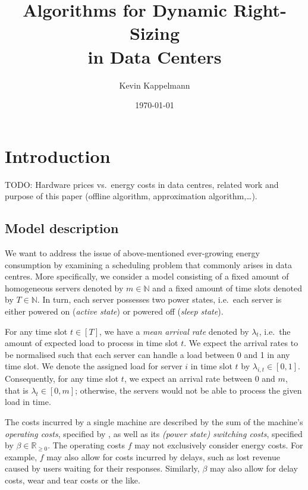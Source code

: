 \documentclass[hidelinks]{article}
\title{\textbf{Algorithms for Dynamic Right-Sizing\\in Data Centers}}
\author{Kevin Kappelmann}
\affil{Chair for Theoretical Computer Science,\\ Technical University of Munich}
\date{\today}
\theoremstyle{plain}
\theoremstyle{definition}
\theoremstyle{rem}
\begin{document}
\maketitle
\newpage
\begingroup\hypersetup{linkcolor=black}
\tableofcontents
\endgroup 
\newpage


\section{Introduction}
TODO: Hardware prices vs.\ energy costs in data centres, related work and purpose of this paper (offline algorithm, approximation algorithm,\ldots).

\subsection{Model description}\label{sec_model_descr}
We want to address the issue of above-mentioned ever-growing energy consumption by examining a scheduling problem that commonly arises in data centres. More specifically, we consider a model consisting of a fixed amount of homogeneous servers denoted by $m\in\mathbb{N}$ and a fixed amount of time slots denoted by $T\in\mathbb{N}$. In turn, each server possesses two power states, i.e.\ each server is either powered on (\textit{active state}) or powered off (\textit{sleep state}).
	
For any time slot $t\in[T]$, we have a \textit{mean arrival rate} denoted by $\lambda_t$, i.e.\ the amount of expected load to process in time slot $t$. We expect the arrival rates to be normalised such that each server can handle a load between 0 and 1 in any time slot. We denote the assigned load for server $i$ in time slot $t$ by $\lambda_{i,t}\in[0,1]$. Consequently, for any time slot $t$, we expect an arrival rate between 0 and $m$, that is $\lambda_t\in[0,m]$; otherwise, the servers would not be able to process the given load in time.

The costs incurred by a single machine are described by the sum of the machine's \textit{operating costs}, specified by , as well as its \textit{(power state) switching costs}, specified by $\beta\in\mathbb{R}_{\ge 0}$. 
The operating costs $f$ may not exclusively consider energy costs. For example, $f$ may also allow for costs incurred by delays, such as lost revenue caused by users waiting for their responses. Similarly, $\beta$ may also allow for delay costs, wear and tear costs or the like.\cite{dyn_right_size}
\end{document}
